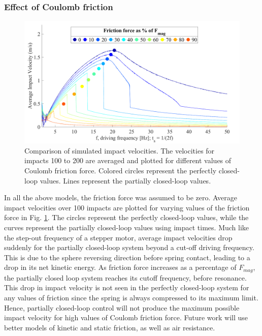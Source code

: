 \documentclass[letterpaper, 10 pt, conference]{ieeeconf}  %
\begin{document}
\subsubsection{Effect of Coulomb friction}
\label{frictionwriteup}
\begin{figure}
	\includegraphics[width=\linewidth]{FrictionForceWithClosedLoopValues.pdf}
		\caption[Effect of Coulomb friction on partially closed-loop control]{Comparison of  simulated impact velocities. The  velocities for impacts 100 to 200 are averaged and plotted for different values of Coulomb friction force. Colored circles represent the perfectly closed-loop values.  Lines represent the partially closed-loop values.}
	\label{friction}
	\vspace{-2em}
\end{figure}
In all the above models, the friction force was assumed to be zero. Average impact velocities over 100 impacts are plotted for varying values of the friction force in Fig. \ref{friction}. The circles represent the perfectly closed-loop values, while the curves represent the partially closed-loop values using impact times. Much like the step-out frequency of a stepper motor, average impact velocities drop suddenly for the partially closed-loop system beyond a cut-off driving frequency. This is due to the sphere reversing direction before spring contact, leading to a drop in its net kinetic energy. As friction force increases as a percentage of $F_{mag}$, the partially closed loop system reaches its cutoff frequency, before resonance. This drop in impact velocity is not seen in the perfectly closed-loop system for any values of friction since the spring is always compressed to its maximum limit. Hence, partially closed-loop control will not produce the maximum possible impact velocity for high values of Coulomb friction force. Future work will use better models of kinetic and static friction, as well as air resistance.
\end{document}
